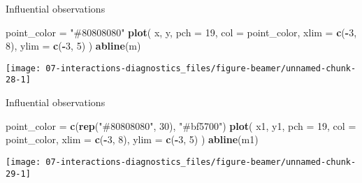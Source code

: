 \documentclass[
  ignorenonframetext,
]{beamer}
\newenvironment{Shaded}{\begin{snugshade}}{\end{snugshade}}
\newcommand{\AttributeTok}[1]{\textcolor[rgb]{0.13,0.29,0.53}{#1}}
\newcommand{\DecValTok}[1]{\textcolor[rgb]{0.00,0.00,0.81}{#1}}
\newcommand{\FunctionTok}[1]{\textcolor[rgb]{0.13,0.29,0.53}{\textbf{#1}}}
\newcommand{\NormalTok}[1]{#1}
\newcommand{\OtherTok}[1]{\textcolor[rgb]{0.56,0.35,0.01}{#1}}
\newcommand{\SpecialCharTok}[1]{\textcolor[rgb]{0.81,0.36,0.00}{\textbf{#1}}}
\newcommand{\StringTok}[1]{\textcolor[rgb]{0.31,0.60,0.02}{#1}}
\begin{document}
\begin{frame}[fragile]{Influential observations}
\label{influential-observations-1}
\begin{Shaded}
\begin{Highlighting}[]
\NormalTok{point\_color }\OtherTok{=} \StringTok{"\#80808080"}
\FunctionTok{plot}\NormalTok{(}
\NormalTok{    x, y, }\AttributeTok{pch =} \DecValTok{19}\NormalTok{, }\AttributeTok{col =}\NormalTok{ point\_color,}
    \AttributeTok{xlim =} \FunctionTok{c}\NormalTok{(}\SpecialCharTok{{-}}\DecValTok{3}\NormalTok{, }\DecValTok{8}\NormalTok{), }\AttributeTok{ylim =} \FunctionTok{c}\NormalTok{(}\SpecialCharTok{{-}}\DecValTok{3}\NormalTok{, }\DecValTok{5}\NormalTok{)}
\NormalTok{)}
\FunctionTok{abline}\NormalTok{(m)}
\end{Highlighting}
\end{Shaded}

\begin{center}\texttt{[image: 07-interactions-diagnostics\_files/figure-beamer/unnamed-chunk-28-1]} \end{center}
\end{frame}

\begin{frame}[fragile]{Influential observations}
\label{influential-observations-2}
\begin{Shaded}
\begin{Highlighting}[]
\NormalTok{point\_color }\OtherTok{=} \FunctionTok{c}\NormalTok{(}\FunctionTok{rep}\NormalTok{(}\StringTok{"\#80808080"}\NormalTok{, }\DecValTok{30}\NormalTok{), }\StringTok{"\#bf5700"}\NormalTok{)}
\FunctionTok{plot}\NormalTok{(}
\NormalTok{    x1, y1, }\AttributeTok{pch =} \DecValTok{19}\NormalTok{, }\AttributeTok{col =}\NormalTok{ point\_color,}
    \AttributeTok{xlim =} \FunctionTok{c}\NormalTok{(}\SpecialCharTok{{-}}\DecValTok{3}\NormalTok{, }\DecValTok{8}\NormalTok{), }\AttributeTok{ylim =} \FunctionTok{c}\NormalTok{(}\SpecialCharTok{{-}}\DecValTok{3}\NormalTok{, }\DecValTok{5}\NormalTok{)}
\NormalTok{)}
\FunctionTok{abline}\NormalTok{(m1)}
\end{Highlighting}
\end{Shaded}

\begin{center}\texttt{[image: 07-interactions-diagnostics\_files/figure-beamer/unnamed-chunk-29-1]} \end{center}
\end{frame}
\end{document}
